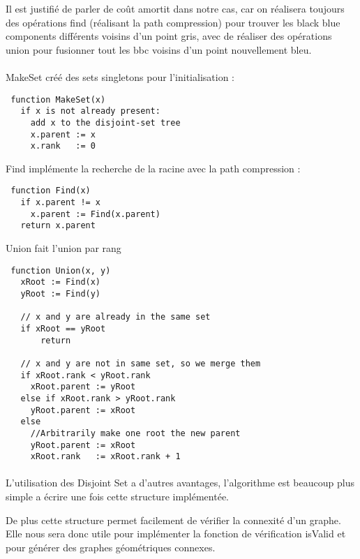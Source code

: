 Il est justifié de parler de coût amortit dans notre cas, car on réalisera toujours des opérations find (réalisant la path compression) pour trouver les black blue components différents voisins d'un point gris, avec de réaliser des opérations union pour fusionner tout les bbc voisins d'un point nouvellement bleu.

\paragraph{}
MakeSet créé des sets singletons pour l'initialisation :
\begin{lstlisting}
 function MakeSet(x)
   if x is not already present:
     add x to the disjoint-set tree
     x.parent := x
     x.rank   := 0
\end{lstlisting}

Find implémente la recherche de la racine avec la path compression :
\begin{lstlisting}
 function Find(x)
   if x.parent != x
     x.parent := Find(x.parent)
   return x.parent
\end{lstlisting}

Union fait l'union par rang
\begin{lstlisting}
 function Union(x, y)
   xRoot := Find(x)
   yRoot := Find(y)
 
   // x and y are already in the same set
   if xRoot == yRoot            
       return
   
   // x and y are not in same set, so we merge them
   if xRoot.rank < yRoot.rank
     xRoot.parent := yRoot
   else if xRoot.rank > yRoot.rank
     yRoot.parent := xRoot
   else
     //Arbitrarily make one root the new parent
     yRoot.parent := xRoot    
     xRoot.rank   := xRoot.rank + 1
\end{lstlisting}

\paragraph{}
L'utilisation des Disjoint Set a d'autres avantages, l'algorithme est beaucoup plus simple a écrire une fois cette structure implémentée.

De plus cette structure permet facilement de vérifier la connexité d'un graphe. Elle nous sera donc utile pour implémenter la fonction de vérification isValid et pour générer des graphes géométriques connexes.

